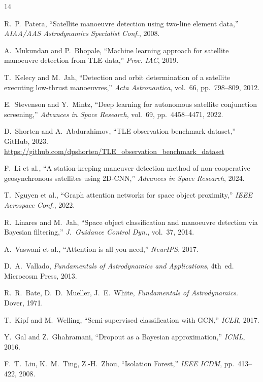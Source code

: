 \documentclass[journal]{IEEEtran}
\begin{document}

\begin{thebibliography}{14}

R.~P.~Patera, ``Satellite manoeuvre detection using two-line element data,''
\textit{AIAA/AAS Astrodynamics Specialist Conf.}, 2008.

A.~Mukundan and P.~Bhopale, ``Machine learning approach for satellite manoeuvre
detection from TLE data,'' \textit{Proc. IAC}, 2019.

T.~Kelecy and M.~Jah, ``Detection and orbit determination of a satellite
executing low-thrust manoeuvres,'' \textit{Acta Astronautica}, vol.~66,
pp.~798--809, 2012.

E.~Stevenson and Y.~Mintz, ``Deep learning for autonomous satellite conjunction
screening,'' \textit{Advances in Space Research}, vol.~69, pp.~4458--4471, 2022.

D.~Shorten and A.~Abdurahimov, ``TLE observation benchmark dataset,''
GitHub, 2023. \url{https://github.com/dpshorten/TLE_observation_benchmark_dataset}

F.~Li et al., ``A station-keeping maneuver detection method of non-cooperative
geosynchronous satellites using 2D-CNN,''
\textit{Advances in Space Research}, 2024.

T.~Nguyen et al., ``Graph attention networks for space object proximity,''
\textit{IEEE Aerospace Conf.}, 2022.

R.~Linares and M.~Jah, ``Space object classification and manoeuvre detection
via Bayesian filtering,'' \textit{J.~Guidance Control Dyn.}, vol.~37, 2014.

A.~Vaswani et al., ``Attention is all you need,'' \textit{NeurIPS}, 2017.

D.~A.~Vallado, \textit{Fundamentals of Astrodynamics and Applications},
4th~ed. Microcosm Press, 2013.

R.~R.~Bate, D.~D.~Mueller, J.~E.~White, \textit{Fundamentals of Astrodynamics}.
Dover, 1971.

T.~Kipf and M.~Welling, ``Semi-supervised classification with GCN,''
\textit{ICLR}, 2017.

Y.~Gal and Z.~Ghahramani, ``Dropout as a Bayesian approximation,''
\textit{ICML}, 2016.

F.~T.~Liu, K.~M.~Ting, Z.-H.~Zhou, ``Isolation Forest,''
\textit{IEEE ICDM}, pp.~413--422, 2008.

\end{thebibliography}
\end{document}
